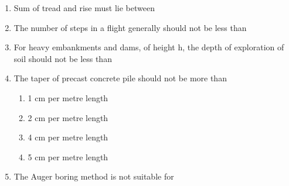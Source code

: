 \documentclass[11pt,a4paper]{article}
\begin{document}
\begin{enumerate}
\\
\item{Sum of tread and rise must lie between}
\\
\item{The number of steps in a flight generally should not be less than}
\\
\item{For heavy embankments and dams, of height h, the depth of exploration of soil should not be less than}
\\
\item{The taper of precast concrete pile should not be more than}
\begin{enumerate}[label=\Alph*.]
\item{1 cm per metre length}
\item{2 cm per metre length}
\item{4 cm per metre length}
\item{5 cm per metre length}
\end{enumerate}
\item{The Auger boring method is not suitable for}

\end{enumerate}
\end{document}
